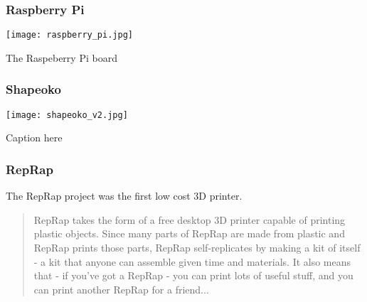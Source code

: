 \subsubsection{Raspberry Pi} %




\begin{NFfigure}
    \begin{center}
        \texttt{[image: raspberry\_pi.jpg]}
    \end{center}
    \caption{The Raspeberry Pi board}
    \label{fig:raspberry_pi}
\end{NFfigure}

\subsubsection{Shapeoko} %

\begin{NFfigure}
    \begin{center}
        \texttt{[image: shapeoko\_v2.jpg]}
    \end{center}
    \caption{Caption here}
    \label{fig:shapeoko_v2}
\end{NFfigure}

\subsubsection{RepRap} %

The RepRap project was the first low cost 3D printer.
\begin{quotation}
RepRap takes the form of a free desktop 3D printer capable of printing plastic objects.
Since many parts of RepRap are made from plastic and RepRap prints those parts, RepRap self-replicates by making a kit of itself - a kit that anyone can assemble given time and materials.
It also means that - if you've got a RepRap - you can print lots of useful stuff, and you can print another RepRap for a friend...
\end{quotation}


